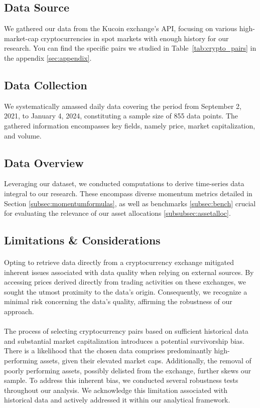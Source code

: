 \documentclass{article}
\begin{document}
\subsection{Data Source}
We gathered our data from the Kucoin exchange's API, focusing on various high-market-cap cryptocurrencies in spot markets with enough history for our research. You can find the specific pairs we studied in Table~\ref{tab:crypto_pairs} in the appendix \ref{sec:appendix}.

\subsection{Data Collection}
We systematically amassed daily data covering the period from September 2, 2021, to January 4, 2024, constituting a sample size of 855 data points. The gathered information encompasses key fields, namely price, market capitalization, and volume.

\subsection{Data Overview}
Leveraging our dataset, we conducted computations to derive time-series data integral to our research. These encompass diverse momentum metrics detailed in Section \ref{subsec:momentumformulas}, as well as benchmarks \ref{subsec:bench} crucial for evaluating the relevance of our asset allocations \ref{subsubsec:assetalloc}.

\subsection{Limitations \& Considerations}
\paragraph{}
Opting to retrieve data directly from a cryptocurrency exchange mitigated inherent issues associated with data quality when relying on external sources. By accessing prices derived directly from trading activities on these exchanges, we sought the utmost proximity to the data's origin. Consequently, we recognize a minimal risk concerning the data's quality, affirming the robustness of our approach.

\paragraph{}
The process of selecting cryptocurrency pairs based on sufficient historical data and substantial market capitalization introduces a potential survivorship bias. There is a likelihood that the chosen data comprises predominantly high-performing assets, given their elevated market caps. Additionally, the removal of poorly performing assets, possibly delisted from the exchange, further skews our sample. To address this inherent bias, we conducted several robustness tests throughout our analysis. We acknowledge this limitation associated with historical data and actively addressed it within our analytical framework.
\end{document}
